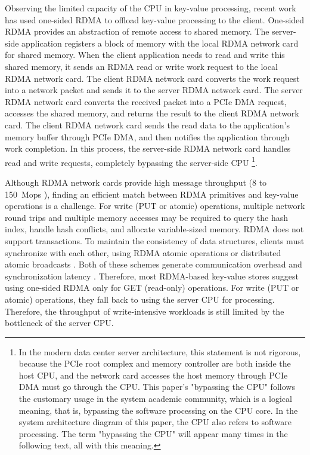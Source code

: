 {{Observing the limited capacity of the CPU in key-value processing, recent work has used one-sided RDMA to offload key-value processing to the client. One-sided RDMA provides an abstraction of remote access to shared memory. The server-side application registers a block of memory with the local RDMA network card for shared memory. When the client application needs to read and write this shared memory, it sends an RDMA read or write work request to the local RDMA network card. The client RDMA network card converts the work request into a network packet and sends it to the server RDMA network card. The server RDMA network card converts the received packet into a PCIe DMA request, accesses the shared memory, and returns the result to the client RDMA network card. The client RDMA network card sends the read data to the application's memory buffer through PCIe DMA, and then notifies the application through work completion. In this process, the server-side RDMA network card handles read and write requests, completely bypassing the server-side CPU \footnote{In the modern data center server architecture, this statement is not rigorous, because the PCIe root complex and memory controller are both inside the host CPU, and the network card accesses the host memory through PCIe DMA must go through the CPU. This paper's "bypassing the CPU" follows the customary usage in the system academic community, which is a logical meaning, that is, bypassing the software processing on the CPU core. In the system architecture diagram of this paper, the CPU also refers to software processing. The term "bypassing the CPU" will appear many times in the following text, all with this meaning.}.

Although RDMA network cards provide high message throughput (8 to 150~Mops \cite {kalia2016design}), finding an efficient match between RDMA primitives and key-value operations is a challenge. For write (PUT or atomic) operations, multiple network round trips and multiple memory accesses may be required to query the hash index, handle hash conflicts, and allocate variable-sized memory. RDMA does not support transactions. To maintain the consistency of data structures, clients must synchronize with each other, using RDMA atomic operations or distributed atomic broadcasts \cite{szepesi2014designing}. Both of these schemes generate communication overhead and synchronization latency \cite {mitchell2013using,dragojevic2014farm}. Therefore, most RDMA-based key-value stores \cite {mitchell2013using,dragojevic2014farm,kalia2014using} suggest using one-sided RDMA only for GET (read-only) operations. For write (PUT or atomic) operations, they fall back to using the server CPU for processing. Therefore, the throughput of write-intensive workloads is still limited by the bottleneck of the server CPU.

}}
